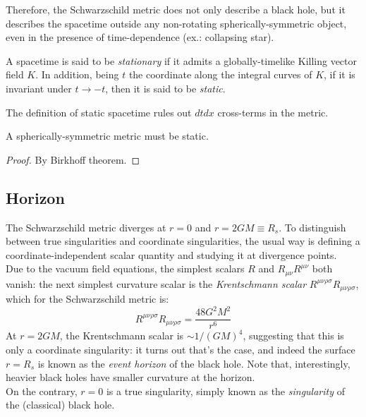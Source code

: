 Therefore, the Schwarzschild metric does not only describe a black hole, but it describes the spacetime outside any non-rotating spherically-symmetric object, even in the presence of time-dependence (ex.: collapsing star).

\begin{definition}\label{def-t-ind}
  A spacetime is said to be \textit{stationary} if it admits a globally-timelike Killing vector field $ K $. In addition, being $ t $ the coordinate along the integral curves of $ K $, if it is invariant under $ t \rightarrow -t $, then it is said to be \textit{static}.
\end{definition}

The definition of static spacetime rules out $ dt dx $ cross-terms in the metric.

\begin{proposition}
  A spherically-symmetric metric must be static.
\end{proposition}
\begin{proof}
  By Birkhoff theorem.
\end{proof}

\subsection{Horizon}

The Schwarzschild metric diverges at $ r = 0 $ and $ r = 2GM \equiv R_s $. To distinguish between true singularities and coordinate singularities, the usual way is defining a coordinate-independent scalar quantity and studying it at divergence points.\\
Due to the vacuum field equations, the simplest scalars $ R $ and $ R_{\mu \nu} R^{\mu \nu} $ both vanish: the next simplest curvature scalar is the \textit{Krentschmann scalar} $ R^{\mu \nu \rho \sigma} R_{\mu \nu \rho \sigma} $, which for the Schwarzschild metric is:
\begin{equation}
  R^{\mu \nu \rho \sigma} R_{\mu \nu \rho \sigma} = \frac{48 G^2 M^2}{r^6}
  \label{eq:6.2}
\end{equation}
At $ r = 2GM $, the Krentschmann scalar is $ \sim 1 / (GM)^4 $, suggesting that this is only a coordinate singularity: it turns out that's the case, and indeed the surface $ r = R_s $ is known as the \textit{event horizon} of the black hole. Note that, interestingly, heavier black holes have smaller curvature at the horizon.\\
On the contrary, $ r = 0 $ is a true singularity, simply known as the \textit{singularity} of the (classical) black hole.

